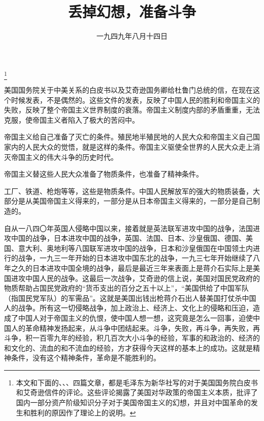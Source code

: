 
\title{丢掉幻想，准备斗争}
\date{一九四九年八月十四日}
\thanks{本文和下面的、、、四篇文章，都是毛泽东为新华社写的对于美国国务院白皮书和艾奇逊信件的评论。这些评论揭露了美国对华政策的帝国主义本质，批评了国内一部分资产阶级知识分子对于美国帝国主义的幻想，并且对中国革命的发生和胜利的原因作了理论上的说明。}
\maketitle


美国国务院关于中美关系的白皮书以及艾奇逊国务卿给杜鲁门总统的信，在现在这个时候发表，不是偶然的。这些文件的发表，反映了中国人民的胜利和帝国主义的失败，反映了整个帝国主义世界制度的衰落。帝国主义制度内部的矛盾重重，无法克服，使帝国主义者陷入了极大的苦闷中。

帝国主义给自己准备了灭亡的条件。殖民地半殖民地的人民大众和帝国主义自己国家内的人民大众的觉悟，就是这样的条件。帝国主义驱使全世界的人民大众走上消灭帝国主义的伟大斗争的历史时代。

帝国主义替这些人民大众准备了物质条件，也准备了精神条件。

工厂、铁道、枪炮等等，这些是物质条件。中国人民解放军的强大的物质装备，大部分是从美国帝国主义得来的，一部分是从日本帝国主义得来的，一部分是自己制造的。

自从一八四〇年英国人侵略中国以来，接着就是英法联军进攻中国的战争，法国进攻中国的战争，日本进攻中国的战争，英国、法国、日本、沙皇俄国、德国、美国、意大利、奥地利等八国联军进攻中国的战争，日本和沙皇俄国在中国领土内进行的战争，一九三一年开始的日本进攻中国东北的战争，一九三七年开始继续了八年之久的日本进攻中国全境的战争，最后是最近三年来表面上是蒋介石实际上是美国进攻中国人民的战争。这最后一次战争，艾奇逊的信上说，美国对国民党政府的物质帮助占国民党政府的“货币支出的百分之五十以上”，“美国供给了中国军队（指国民党军队）的军需品”。这就是美国出钱出枪蒋介石出人替美国打仗杀中国人的战争。所有这一切侵略战争，加上政治上、经济上、文化上的侵略和压迫，造成了中国人对于帝国主义的仇恨，使中国人想一想，这究竟是怎么一回事，迫使中国人的革命精神发扬起来，从斗争中团结起来。斗争，失败，再斗争，再失败，再斗争，积一百零九年的经验，积几百次大小斗争的经验，军事的和政治的、经济的和文化的、流血的和不流血的经验，方才获得今天这样的基本上的成功。这就是精神条件，没有这个精神条件，革命是不能胜利的。

